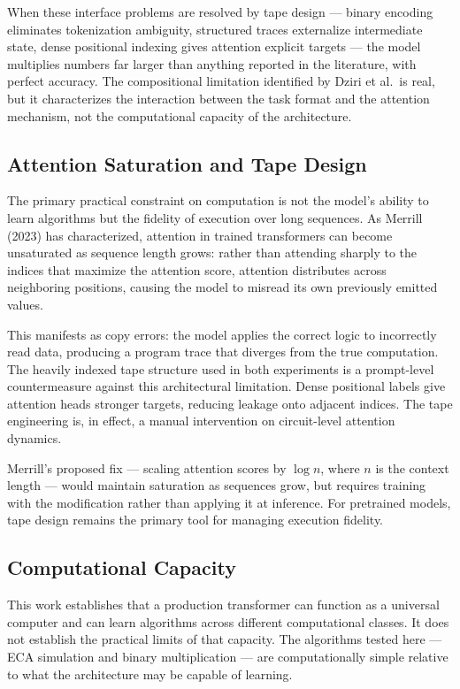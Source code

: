 \documentclass[twocolumn,switch,10pt]{article}
\begin{document}
When these interface problems are resolved by tape design --- binary encoding eliminates tokenization ambiguity, structured traces externalize intermediate state, dense positional indexing gives attention explicit targets --- the model multiplies numbers far larger than anything reported in the literature, with perfect accuracy. The compositional limitation identified by Dziri et al.~is real, but it characterizes the interaction between the task format and the attention mechanism, not the computational capacity of the architecture.

\subsection{Attention Saturation and Tape Design}\label{attention-saturation-and-tape-design}

The primary practical constraint on computation is not the model's ability to learn algorithms but the fidelity of execution over long sequences. As Merrill (2023) has characterized, attention in trained transformers can become unsaturated as sequence length grows: rather than attending sharply to the indices that maximize the attention score, attention distributes across neighboring positions, causing the model to misread its own previously emitted values.

This manifests as copy errors: the model applies the correct logic to incorrectly read data, producing a program trace that diverges from the true computation. The heavily indexed tape structure used in both experiments is a prompt-level countermeasure against this architectural limitation. Dense positional labels give attention heads stronger targets, reducing leakage onto adjacent indices. The tape engineering is, in effect, a manual intervention on circuit-level attention dynamics.

Merrill's proposed fix --- scaling attention scores by \(\log n\), where \(n\) is the context length --- would maintain saturation as sequences grow, but requires training with the modification rather than applying it at inference. For pretrained models, tape design remains the primary tool for managing execution fidelity.

\subsection{Computational Capacity}\label{computational-capacity}

This work establishes that a production transformer can function as a universal computer and can learn algorithms across different computational classes. It does not establish the practical limits of that capacity. The algorithms tested here --- ECA simulation and binary multiplication --- are computationally simple relative to what the architecture may be capable of learning.
\end{document}

